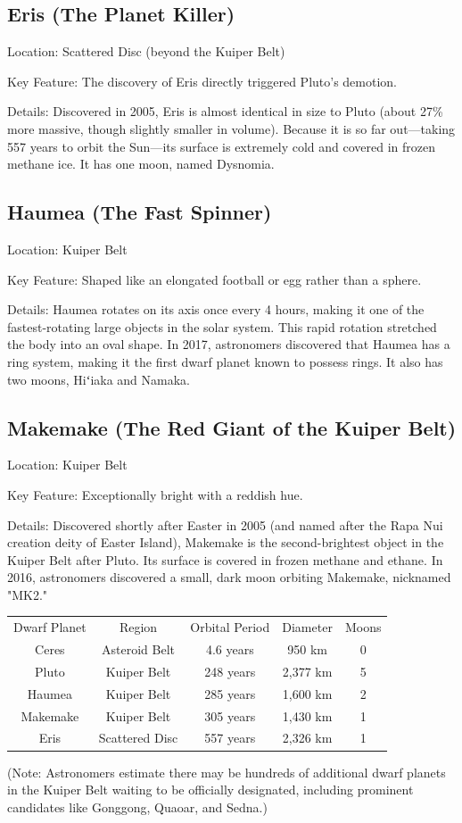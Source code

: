 \subsection{ Eris (The Planet Killer)}

Location: Scattered Disc (beyond the Kuiper Belt)

Key Feature: The discovery of Eris directly triggered Pluto's demotion.

Details: Discovered in 2005, Eris is almost identical in size to Pluto (about 27\% more massive, though slightly smaller in volume). Because it is so far out—taking 557 years to orbit the Sun—its surface is extremely cold and covered in frozen methane ice. It has one moon, named Dysnomia.

\subsection{Haumea (The Fast Spinner)}

Location: Kuiper Belt

Key Feature: Shaped like an elongated football or egg rather than a sphere.

Details: Haumea rotates on its axis once every 4 hours, making it one of the fastest-rotating large objects in the solar system. This rapid rotation stretched the body into an oval shape. In 2017, astronomers discovered that Haumea has a ring system, making it the first dwarf planet known to possess rings. It also has two moons, Hiʻiaka and Namaka.

\subsection{ Makemake (The Red Giant of the Kuiper Belt)}
Location: Kuiper Belt

Key Feature: Exceptionally bright with a reddish hue.

Details: Discovered shortly after Easter in 2005 (and named after the Rapa Nui creation deity of Easter Island), Makemake is the second-brightest object in the Kuiper Belt after Pluto. Its surface is covered in frozen methane and ethane. In 2016, astronomers discovered a small, dark moon orbiting Makemake, nicknamed "MK2."
\begin{tabular}{ccccc}
    Dwarf Planet&	Region&	Orbital Period	&Diameter &	Moons\\
    Ceres &	Asteroid Belt&	4.6 years&	950 km &	0\\
    Pluto	&Kuiper Belt&	248 years	&2,377 km &	5\\
    Haumea	&Kuiper Belt&	285 years&	1,600 km &	2\\
    Makemake&	Kuiper Belt&	305 years&	1,430 km &	1\\
    Eris&	Scattered Disc&	557 years&	2,326 km &	1
\end{tabular}
(Note: Astronomers estimate there may be hundreds of additional dwarf planets in the Kuiper Belt waiting to be officially designated, including prominent candidates like Gonggong, Quaoar, and Sedna.)


